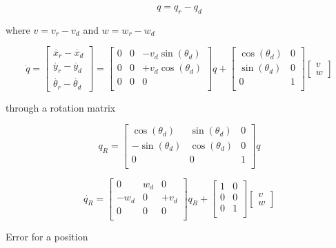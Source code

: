 \documentclass[a4paper,12pt]{article}
\begin{document}
\begin{itemize}
\begin{appendices}
$$ q = q_r-q_d $$

where $v=v_r-v_d$ and $w=w_r-w_d$

$$ \dot{q}=
	\begin{bmatrix} \dot{x_r}-\dot{x_d} \\ \dot{y_r}-\dot{y_d} \\ \dot{\theta_r}-\dot{\theta_d}  \end{bmatrix}
	=  	
  	\begin{bmatrix}
   	0 & 0 & -v_d \sin (\theta_d) \\
   	0 & 0 & +v_d \cos (\theta_d) \\
   	0 & 0 & 0 \\
   	\end{bmatrix}
	q
	+
	\begin{bmatrix}
	\cos (\theta_d) & 0 \\
   	\sin (\theta_d) & 0 \\
    0 & 1 \\
	\end{bmatrix}		
	\begin{bmatrix} v \\ w \end{bmatrix}
$$

through a rotation matrix 

$$ 
	q_R
	=  	
  	\begin{bmatrix}
   	\cos (\theta_d) & \sin (\theta_d) & 0 \\
   	-\sin (\theta_d) & \cos (\theta_d) & 0 \\
   	0 & 0 & 1 \\
   	\end{bmatrix}
   	q
$$

$$ \dot{q_R}
	=  	
  	\begin{bmatrix}
   	0 & w_d & 0 \\
   	-w_d & 0 & +v_d  \\
   	0 & 0 & 0 \\
   	\end{bmatrix}
	q_R
	+
	\begin{bmatrix}
	1 & 0 \\
   	0 & 0 \\
    0 & 1 \\
	\end{bmatrix}		
	\begin{bmatrix} v \\ w \end{bmatrix}
$$

	Error for a position



\end{appendices}
\end{itemize}
\end{document}
